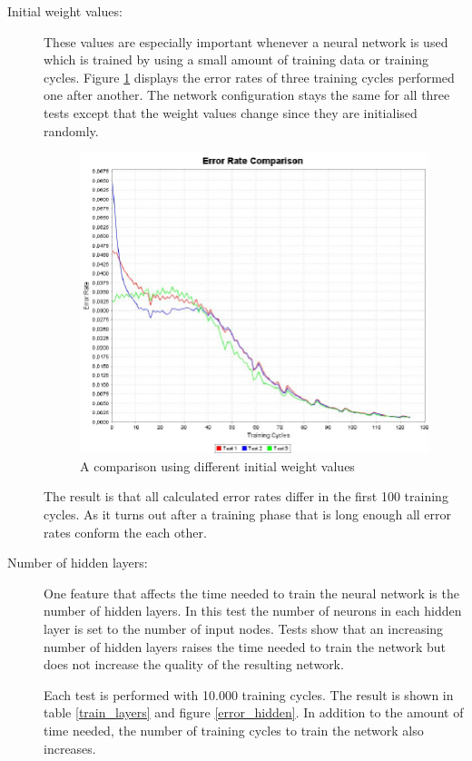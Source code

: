 \begin{description}
	\item [Initial weight values:] These values are especially important whenever a neural network is used which is trained by using a small amount of training data or training cycles. Figure \ref{error_weights} displays the error rates of three training cycles performed one after another. The network configuration stays the same for all three tests except that the weight values change since they are initialised randomly.

\begin{figure}[htbp]
	\begin{center}
		\includegraphics[width=0.7\columnwidth]{graphics/Error_time}
	\end{center}
	\vspace{-1em}
	\caption{A comparison using different initial weight values}
	\label{error_weights}
\vspace{1.5em}
\end{figure}

The result is that all calculated error rates differ in the first 100 training cycles. As it turns out after a training phase that is long enough all error rates conform the each other.
\pagebreak

\item [Number of hidden layers:] One feature that affects the time needed to train the neural network is the number of hidden layers. In this test the number of neurons in each hidden layer is set to the number of input nodes. Tests show that an increasing number of hidden layers raises the time needed to train the network but does not increase the quality of the resulting network.

Each test is performed with 10.000 training cycles. The result is shown in table \ref{train_layers} and figure \ref{error_hidden}. In addition to the amount of time needed, the number of training cycles to train the network also increases.


\end{description}
